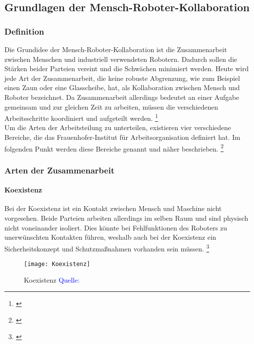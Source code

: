 \documentclass[titlepage,12pt,twoside]{article}
\begin{document}
\subsection{Grundlagen der Mensch-Roboter-Kollaboration}
\subsubsection{Definition}
Die Grundidee der Mensch-Roboter-Kollaboration ist die Zusammenarbeit zwischen 
Menschen und industriell verwendeten Robotern. Dadurch sollen die Stärken beider 
Parteien vereint und die Schwächen minimiert werden. Heute wird jede Art der 
Zusammenarbeit, die keine robuste Abgrenzung, wie zum Beispiel einen Zaun oder 
eine Glasscheibe, hat, als Kollaboration zwischen Mensch und Roboter bezeichnet. 
Da Zusammenarbeit allerdings bedeutet an einer Aufgabe gemeinsam und zur gleichen 
Zeit zu arbeiten, müssen die verschiedenen Arbeitsschritte koordiniert und 
aufgeteilt werden. \footnote{\cite{rubigm.p10}} \\
\hfill \break
\hfill \break
\hfill \break
Um die Arten der Arbeitsteilung zu unterteilen, existieren vier verschiedene 
Bereiche, die das Frauenhofer-Institut für Arbeitsorganisation definiert hat. Im 
folgenden Punkt werden diese Bereiche genannt und näher beschrieben. \footnote{\cite{rubigm.p11}}\\
\subsubsection{Arten der Zusammenarbeit}
\paragraph{Koexistenz}
\hfill \break
\hfill \break
Bei der Koexistenz ist ein Kontakt zwischen Mensch und Maschine nicht vorgesehen. 
Beide Parteien arbeiten allerdings im selben Raum und sind physisch nicht 
voneinander isoliert. Dies könnte bei Fehlfunktionen des Roboters zu unerwünschten 
Kontakten führen, weshalb auch bei der Koexistenz ein Sicherheitskonzept und 
Schutzmaßnahmen vorhanden sein müssen. \footnote{\cite{rubigm.p11}} \\
\begin{figure}[H]
	\begin{center}
		\scalebox{0.4}
		{\texttt{[image: Koexistenz]}}
		\caption{Koexistenz \textcolor{blue}{Quelle: \cite{rubigm.p11}}}
		\label{fig:Koexistenz}
	\end{center}
\end{figure}
\hfill \break
\newpage
\end{document}
